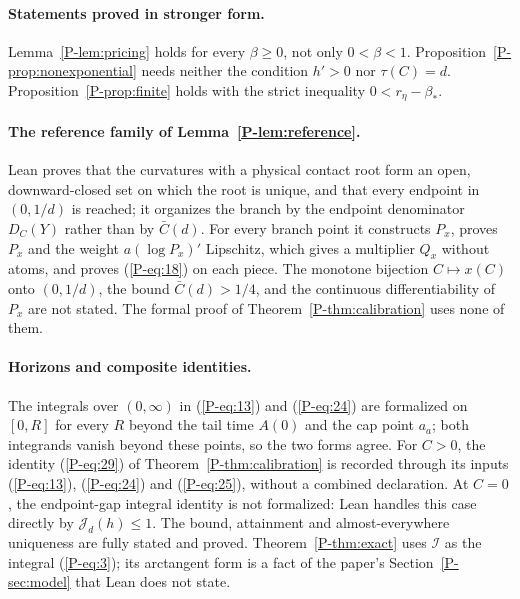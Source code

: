 \documentclass[11pt]{article}
\newcommand{\pref}[1]{\ref*{P-#1}}
\newcommand{\peqref}[1]{(\ref*{P-#1})}
\begin{document}
\paragraph{Statements proved in stronger form.}
Lemma~\pref{lem:pricing} holds for every $\beta\ge0$, not only
$0<\beta<1$. Proposition~\pref{prop:nonexponential} needs neither the
condition $h'>0$ nor $\tau(C)=d$. Proposition~\pref{prop:finite} holds with
the strict inequality $0<r_\eta-\beta_*$.

\paragraph{The reference family of Lemma~\pref{lem:reference}.}
Lean proves that the curvatures with a physical contact root form an open,
downward-closed set on which the root is unique, and that every endpoint in
$(0,1/d)$ is reached; it organizes the branch by the endpoint denominator
$D_C(Y)$ rather than by $\bar C(d)$. For every branch point it constructs
$P_x$, proves $P_x$ and the weight $a(\log P_x)'$ Lipschitz, which gives a
multiplier $Q_x$ without atoms, and proves \peqref{eq:18} on each piece.
The monotone bijection $C\mapsto x(C)$ onto $(0,1/d)$, the bound
$\bar C(d)>1/4$, and the continuous differentiability of $P_x$ are not
stated. The formal proof of Theorem~\pref{thm:calibration} uses none of
them.

\paragraph{Horizons and composite identities.}
The integrals over $(0,\infty)$ in \peqref{eq:13} and \peqref{eq:24} are
formalized on $[0,R]$ for every $R$ beyond the tail time $A(0)$ and the cap
point $a_a$; both integrands vanish beyond these points, so the two forms
agree. For $C>0$, the identity \peqref{eq:29} of
Theorem~\pref{thm:calibration} is recorded through its inputs
\peqref{eq:13}, \peqref{eq:24} and \peqref{eq:25}, without a
combined declaration. At $C=0$, the endpoint-gap integral identity is
not formalized: Lean handles this case directly by
$\mathcal J_d(h)\le1$. The bound, attainment and almost-everywhere
uniqueness are fully stated and proved. Theorem~\pref{thm:exact}
uses $\mathcal I$ as the
integral \peqref{eq:3}; its arctangent form is a fact of the paper's
Section~\pref{sec:model} that Lean does not state.
\end{document}
